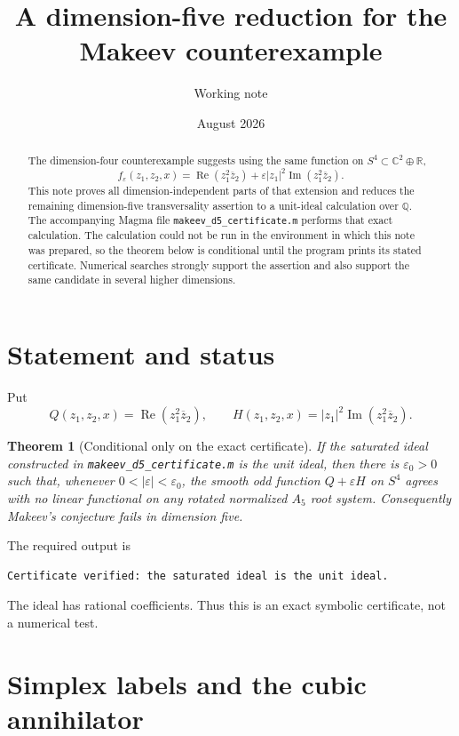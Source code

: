 \documentclass[11pt,reqno]{amsart}
\title{A dimension-five reduction for the\\Makeev counterexample}
\author{Working note}
\date{August 2026}
\newtheorem{theorem}{Theorem}[section]
\theoremstyle{remark}
\newcommand{\R}{\mathbb R}
\newcommand{\C}{\mathbb C}
\newcommand{\eps}{\varepsilon}
\newcommand{\abs}[1]{\left\lvert #1\right\rvert}
\begin{document}
\begin{abstract}
The dimension-four counterexample suggests using the same function on
$S^4\subset\C^2\oplus\R$,
\[
 f_\eps(z_1,z_2,x)=\operatorname{Re}(z_1^2\overline z_2)
 +\eps\abs{z_1}^2\operatorname{Im}(z_1^2\overline z_2).
\]
This note proves all dimension-independent parts of that extension and reduces
the remaining dimension-five transversality assertion to a unit-ideal
calculation over $\mathbb Q$.  The accompanying Magma file
\texttt{makeev\_d5\_certificate.m} performs that exact calculation.  The
calculation could not be run in the environment in which this note was
prepared, so the theorem below is conditional until the program prints its
stated certificate.  Numerical searches strongly support the assertion and
also support the same candidate in several higher dimensions.
\end{abstract}

\maketitle

\section{Statement and status}

Put
\[
 Q(z_1,z_2,x)=\operatorname{Re}(z_1^2\overline z_2),\qquad
 H(z_1,z_2,x)=\abs{z_1}^2\operatorname{Im}(z_1^2\overline z_2).
\]

\begin{theorem}[Conditional only on the exact certificate]\label{thm:main}
If the saturated ideal constructed in
\texttt{makeev\_d5\_certificate.m} is the unit ideal, then there is
$\eps_0>0$ such that, whenever $0<\abs\eps<\eps_0$, the smooth odd function
$Q+\eps H$ on $S^4$ agrees with no linear functional on any rotated normalized
$A_5$ root system.  Consequently Makeev's conjecture fails in dimension five.
\end{theorem}

The required output is
\begin{verbatim}
Certificate verified: the saturated ideal is the unit ideal.
\end{verbatim}
The ideal has rational coefficients.  Thus this is an exact symbolic
certificate, not a numerical test.

\section{Simplex labels and the cubic annihilator}
\end{document}

